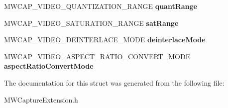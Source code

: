 \begin{DoxyCompactItemize}
\item 
\hypertarget{struct__MWCAP__VIDEO__PROCESS__SETTINGS_a6254f2bb80b6f6f3f4792683f30e7a94}{M\-W\-C\-A\-P\-\_\-\-V\-I\-D\-E\-O\-\_\-\-Q\-U\-A\-N\-T\-I\-Z\-A\-T\-I\-O\-N\-\_\-\-R\-A\-N\-G\-E {\bfseries quant\-Range}}\label{struct__MWCAP__VIDEO__PROCESS__SETTINGS_a6254f2bb80b6f6f3f4792683f30e7a94}

\item 
\hypertarget{struct__MWCAP__VIDEO__PROCESS__SETTINGS_abf6b180de7d68e6f72ab0938926a4e76}{M\-W\-C\-A\-P\-\_\-\-V\-I\-D\-E\-O\-\_\-\-S\-A\-T\-U\-R\-A\-T\-I\-O\-N\-\_\-\-R\-A\-N\-G\-E {\bfseries sat\-Range}}\label{struct__MWCAP__VIDEO__PROCESS__SETTINGS_abf6b180de7d68e6f72ab0938926a4e76}

\item 
\hypertarget{struct__MWCAP__VIDEO__PROCESS__SETTINGS_a289c3fcff713f2faae557e9a48a3f5d7}{M\-W\-C\-A\-P\-\_\-\-V\-I\-D\-E\-O\-\_\-\-D\-E\-I\-N\-T\-E\-R\-L\-A\-C\-E\-\_\-\-M\-O\-D\-E {\bfseries deinterlace\-Mode}}\label{struct__MWCAP__VIDEO__PROCESS__SETTINGS_a289c3fcff713f2faae557e9a48a3f5d7}

\item 
\hypertarget{struct__MWCAP__VIDEO__PROCESS__SETTINGS_ad86509899f4aa105fe5e01553333b7a0}{M\-W\-C\-A\-P\-\_\-\-V\-I\-D\-E\-O\-\_\-\-A\-S\-P\-E\-C\-T\-\_\-\-R\-A\-T\-I\-O\-\_\-\-C\-O\-N\-V\-E\-R\-T\-\_\-\-M\-O\-D\-E {\bfseries aspect\-Ratio\-Convert\-Mode}}\label{struct__MWCAP__VIDEO__PROCESS__SETTINGS_ad86509899f4aa105fe5e01553333b7a0}

\end{DoxyCompactItemize}


The documentation for this struct was generated from the following file\-:\begin{DoxyCompactItemize}
\item 
M\-W\-Capture\-Extension.\-h\end{DoxyCompactItemize}
